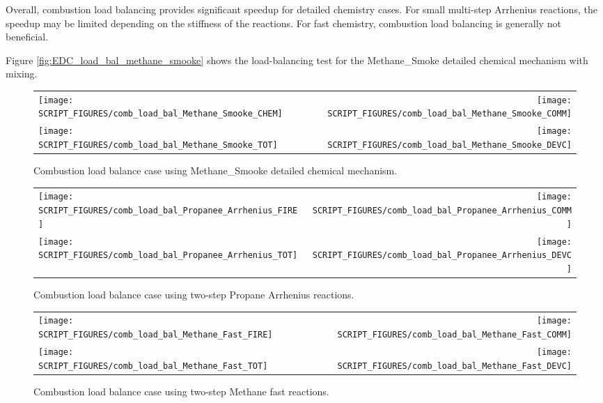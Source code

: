 \documentclass[11pt]{book}
\begin{document}
Overall, combustion load balancing provides significant speedup for detailed chemistry cases. For small multi-step Arrhenius reactions, the speedup may be limited depending on the stiffness of the reactions. For fast chemistry, combustion load balancing is generally not beneficial.

Figure \ref{fig:EDC_load_bal_methane_smooke} shows the load-balancing test for the Methane\_Smoke detailed chemical mechanism with mixing.  


\begin{figure}[p]
\begin{tabular*}{\textwidth}{lr}
\texttt{[image: SCRIPT\_FIGURES/comb\_load\_bal\_Methane\_Smooke\_CHEM]} &
\texttt{[image: SCRIPT\_FIGURES/comb\_load\_bal\_Methane\_Smooke\_COMM]} \\
\texttt{[image: SCRIPT\_FIGURES/comb\_load\_bal\_Methane\_Smooke\_TOT]} &
\texttt{[image: SCRIPT\_FIGURES/comb\_load\_bal\_Methane\_Smooke\_DEVC]}
\end{tabular*}
\caption[Results of the  test cases]{Combustion load balance case using Methane\_Smooke detailed chemical mechanism.}
\label{fig:comb_load_bal_methane_smooke}
\end{figure}

\begin{figure}[p]
\begin{tabular*}{\textwidth}{lr}
\texttt{[image: SCRIPT\_FIGURES/comb\_load\_bal\_Propanee\_Arrhenius\_FIRE]} &
\texttt{[image: SCRIPT\_FIGURES/comb\_load\_bal\_Propanee\_Arrhenius\_COMM]} \\
\texttt{[image: SCRIPT\_FIGURES/comb\_load\_bal\_Propanee\_Arrhenius\_TOT]} &
\texttt{[image: SCRIPT\_FIGURES/comb\_load\_bal\_Propanee\_Arrhenius\_DEVC]}
\end{tabular*}
\caption[Results of the  test cases]{Combustion load balance case using two-step Propane Arrhenius reactions.}
\label{fig:comb_load_bal_2step_Arrhenius}
\end{figure}

\begin{figure}[p]
\begin{tabular*}{\textwidth}{lr}
\texttt{[image: SCRIPT\_FIGURES/comb\_load\_bal\_Methane\_Fast\_FIRE]} &
\texttt{[image: SCRIPT\_FIGURES/comb\_load\_bal\_Methane\_Fast\_COMM]} \\
\texttt{[image: SCRIPT\_FIGURES/comb\_load\_bal\_Methane\_Fast\_TOT]} &
\texttt{[image: SCRIPT\_FIGURES/comb\_load\_bal\_Methane\_Fast\_DEVC]}
\end{tabular*}
\caption[Results of the  test cases]{Combustion load balance case using two-step Methane fast reactions.}
\label{fig:comb_load_bal_2step_fast}
\end{figure}
\end{document}
